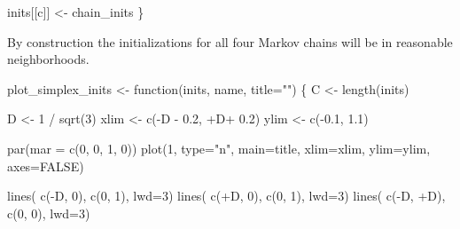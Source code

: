 \documentclass[
  letterpaper,
  DIV=11,
  numbers=noendperiod]{scrartcl}
\newenvironment{Shaded}{\begin{snugshade}}{\end{snugshade}}
\newcommand{\AttributeTok}[1]{\textcolor[rgb]{0.40,0.45,0.13}{#1}}
\newcommand{\ConstantTok}[1]{\textcolor[rgb]{0.56,0.35,0.01}{#1}}
\newcommand{\ControlFlowTok}[1]{\textcolor[rgb]{0.00,0.23,0.31}{#1}}
\newcommand{\DecValTok}[1]{\textcolor[rgb]{0.68,0.00,0.00}{#1}}
\newcommand{\FloatTok}[1]{\textcolor[rgb]{0.68,0.00,0.00}{#1}}
\newcommand{\FunctionTok}[1]{\textcolor[rgb]{0.28,0.35,0.67}{#1}}
\newcommand{\NormalTok}[1]{\textcolor[rgb]{0.00,0.23,0.31}{#1}}
\newcommand{\OtherTok}[1]{\textcolor[rgb]{0.00,0.23,0.31}{#1}}
\newcommand{\SpecialCharTok}[1]{\textcolor[rgb]{0.37,0.37,0.37}{#1}}
\newcommand{\StringTok}[1]{\textcolor[rgb]{0.13,0.47,0.30}{#1}}
\begin{document}
\begin{Shaded}
\begin{Highlighting}[]
\NormalTok{  inits[[c]] }\OtherTok{\textless{}{-}}\NormalTok{ chain\_inits}
\NormalTok{\}}
\end{Highlighting}
\end{Shaded}

By construction the initializations for all four Markov chains will be
in reasonable neighborhoods.

\begin{Shaded}
\begin{Highlighting}[]
\NormalTok{plot\_simplex\_inits }\OtherTok{\textless{}{-}} \ControlFlowTok{function}\NormalTok{(inits, name, }\AttributeTok{title=}\StringTok{""}\NormalTok{) \{}
\NormalTok{  C }\OtherTok{\textless{}{-}} \FunctionTok{length}\NormalTok{(inits)}

\NormalTok{  D }\OtherTok{\textless{}{-}} \DecValTok{1} \SpecialCharTok{/} \FunctionTok{sqrt}\NormalTok{(}\DecValTok{3}\NormalTok{)}
\NormalTok{  xlim }\OtherTok{\textless{}{-}} \FunctionTok{c}\NormalTok{(}\SpecialCharTok{{-}}\NormalTok{D }\SpecialCharTok{{-}} \FloatTok{0.2}\NormalTok{, }\SpecialCharTok{+}\NormalTok{D}\SpecialCharTok{+} \FloatTok{0.2}\NormalTok{)}
\NormalTok{  ylim }\OtherTok{\textless{}{-}} \FunctionTok{c}\NormalTok{(}\SpecialCharTok{{-}}\FloatTok{0.1}\NormalTok{, }\FloatTok{1.1}\NormalTok{)}

  \FunctionTok{par}\NormalTok{(}\AttributeTok{mar =} \FunctionTok{c}\NormalTok{(}\DecValTok{0}\NormalTok{, }\DecValTok{0}\NormalTok{, }\DecValTok{1}\NormalTok{, }\DecValTok{0}\NormalTok{))}
  \FunctionTok{plot}\NormalTok{(}\DecValTok{1}\NormalTok{, }\AttributeTok{type=}\StringTok{"n"}\NormalTok{, }\AttributeTok{main=}\NormalTok{title,}
       \AttributeTok{xlim=}\NormalTok{xlim, }\AttributeTok{ylim=}\NormalTok{ylim,}
       \AttributeTok{axes=}\ConstantTok{FALSE}\NormalTok{)}

  \FunctionTok{lines}\NormalTok{( }\FunctionTok{c}\NormalTok{(}\SpecialCharTok{{-}}\NormalTok{D, }\DecValTok{0}\NormalTok{),  }\FunctionTok{c}\NormalTok{(}\DecValTok{0}\NormalTok{, }\DecValTok{1}\NormalTok{), }\AttributeTok{lwd=}\DecValTok{3}\NormalTok{)}
  \FunctionTok{lines}\NormalTok{( }\FunctionTok{c}\NormalTok{(}\SpecialCharTok{+}\NormalTok{D, }\DecValTok{0}\NormalTok{),  }\FunctionTok{c}\NormalTok{(}\DecValTok{0}\NormalTok{, }\DecValTok{1}\NormalTok{), }\AttributeTok{lwd=}\DecValTok{3}\NormalTok{)}
  \FunctionTok{lines}\NormalTok{( }\FunctionTok{c}\NormalTok{(}\SpecialCharTok{{-}}\NormalTok{D, }\SpecialCharTok{+}\NormalTok{D), }\FunctionTok{c}\NormalTok{(}\DecValTok{0}\NormalTok{, }\DecValTok{0}\NormalTok{), }\AttributeTok{lwd=}\DecValTok{3}\NormalTok{)}


\end{Highlighting}
\end{Shaded}
\end{document}
